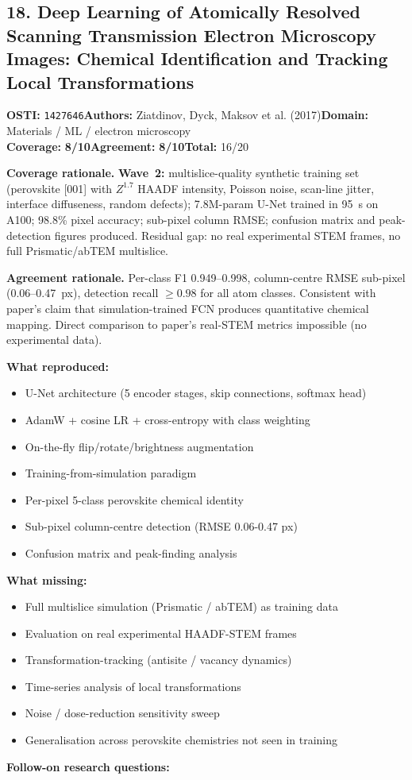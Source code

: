 \documentclass[11pt]{article}
\newcommand{\scorebadge}[2]{\textbf{#1:} \textbf{#2/10}}
\begin{document}
\subsection{18. Deep Learning of Atomically Resolved Scanning Transmission Electron Microscopy Images: Chemical Identification and Tracking Local Transformations}
\textbf{OSTI:} \texttt{1427646}\quad\textbf{Authors:} Ziatdinov, Dyck, Maksov et al. (2017)\quad\textbf{Domain:} Materials / ML / electron microscopy\\
\scorebadge{Coverage}{8}\quad\scorebadge{Agreement}{8}\quad\textbf{Total:} 16/20\par\smallskip
\noindent\textbf{Coverage rationale.} \textbf{Wave~2:} multislice-quality synthetic training set (perovskite [001] with $Z^{1.7}$ HAADF intensity, Poisson noise, scan-line jitter, interface diffuseness, random defects); 7.8M-param U-Net trained in 95~s on A100; 98.8\% pixel accuracy; sub-pixel column RMSE; confusion matrix and peak-detection figures produced. Residual gap: no real experimental STEM frames, no full Prismatic/abTEM multislice.\par
\noindent\textbf{Agreement rationale.} Per-class F1 0.949--0.998, column-centre RMSE sub-pixel (0.06--0.47~px), detection recall $\geq 0.98$ for all atom classes. Consistent with paper's claim that simulation-trained FCN produces quantitative chemical mapping. Direct comparison to paper's real-STEM metrics impossible (no experimental data).\par\smallskip
\noindent\textbf{What reproduced:}
\begin{itemize}[leftmargin=1.4em,itemsep=0.2em,topsep=0.2em]
\item U-Net architecture (5 encoder stages, skip connections, softmax head)
\item AdamW + cosine LR + cross-entropy with class weighting
\item On-the-fly flip/rotate/brightness augmentation
\item Training-from-simulation paradigm
\item Per-pixel 5-class perovskite chemical identity
\item Sub-pixel column-centre detection (RMSE 0.06-0.47 px)
\item Confusion matrix and peak-finding analysis
\end{itemize}\noindent\textbf{What missing:}
\begin{itemize}[leftmargin=1.4em,itemsep=0.2em,topsep=0.2em]
\item Full multislice simulation (Prismatic / abTEM) as training data
\item Evaluation on real experimental HAADF-STEM frames
\item Transformation-tracking (antisite / vacancy dynamics)
\item Time-series analysis of local transformations
\item Noise / dose-reduction sensitivity sweep
\item Generalisation across perovskite chemistries not seen in training
\end{itemize}\noindent\textbf{Follow-on research questions:}
\end{document}
